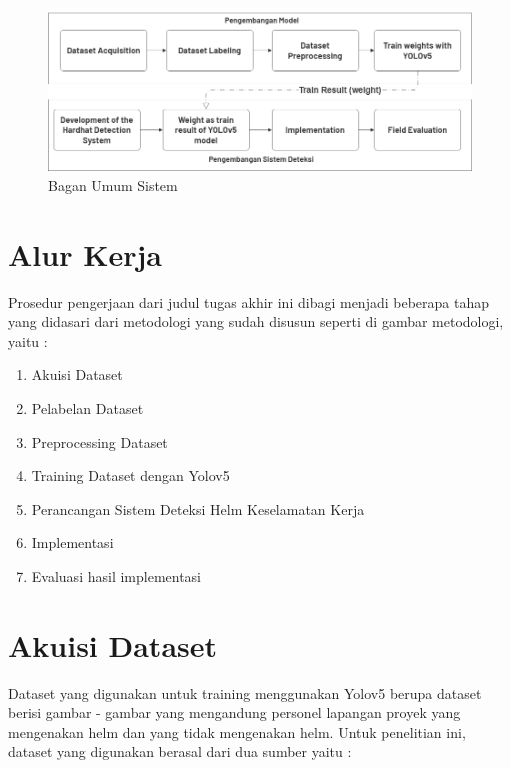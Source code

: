\begin{figure}[ht]
  \centering
  \includegraphics[width=1.0\textwidth]{gambar/Metodologi CNN.png}
  \caption{Bagan Umum Sistem}
  \label{fig:baganumumsistem}  
\end{figure}

\section{Alur Kerja}
\label{sec:alurkerja}

Prosedur pengerjaan dari judul tugas akhir ini dibagi menjadi beberapa tahap yang didasari dari metodologi yang sudah disusun seperti di gambar metodologi, yaitu :

\begin{enumerate}[nolistsep]
  \item Akuisi Dataset
  \item Pelabelan Dataset
  \item Preprocessing Dataset
  \item Training Dataset dengan Yolov5
  \item Perancangan Sistem Deteksi Helm Keselamatan Kerja
  \item Implementasi
  \item Evaluasi hasil implementasi
\end{enumerate}


\section{Akuisi Dataset}
\label{sec:akuisisidataset}

Dataset yang digunakan untuk training menggunakan Yolov5 berupa dataset berisi gambar - gambar yang mengandung personel lapangan proyek yang mengenakan helm dan yang tidak mengenakan helm. Untuk penelitian ini, dataset yang digunakan berasal dari dua sumber yaitu :

